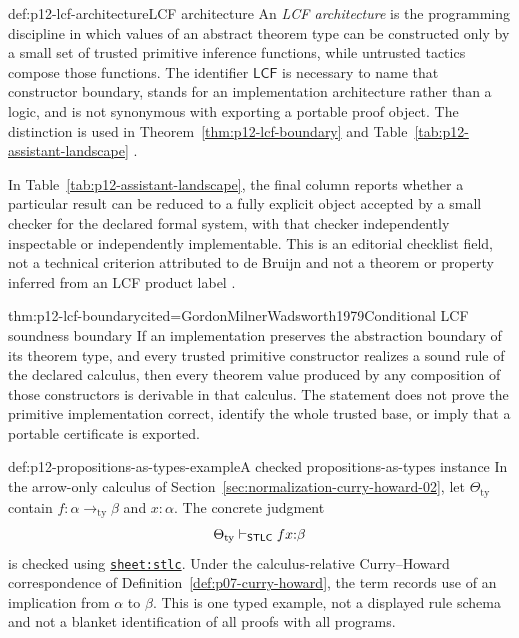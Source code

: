 \begin{hbdefinition}{def:p12-lcf-architecture}{LCF architecture}
An \emph{LCF architecture} is the programming discipline in which values of an
abstract theorem type can be constructed only by a small set of trusted
primitive inference functions, while untrusted tactics compose those
functions.  The identifier \(\mathsf{LCF}\) is necessary to name that
constructor boundary, stands for an implementation architecture rather than a
logic, and is not synonymous with exporting a portable proof object.  The
distinction is used in Theorem~\ref{thm:p12-lcf-boundary} and
Table~\ref{tab:p12-assistant-landscape}
\cite{GordonMilnerWadsworth1979}.
\end{hbdefinition}

In Table~\ref{tab:p12-assistant-landscape}, the final column reports whether a
particular result can be reduced to a fully explicit object accepted by a
small checker for the declared formal system, with that checker independently
inspectable or independently implementable.  This is an editorial checklist
field, not a technical criterion attributed to de Bruijn and not a theorem or
property inferred from an LCF product label \cite{DeBruijn1970,Pollack1998}.

\begin{hbtheorem}{thm:p12-lcf-boundary}{cited=GordonMilnerWadsworth1979}{Conditional LCF soundness boundary}
If an implementation preserves the abstraction boundary of its theorem type,
and every trusted primitive constructor realizes a sound rule of the declared
calculus, then every theorem value produced by any composition of those
constructors is derivable in that calculus.  The statement does not prove the
primitive implementation correct, identify the whole trusted base, or imply
that a portable certificate is exported.
\end{hbtheorem}

\begin{hbexample}{def:p12-propositions-as-types-example}{A checked propositions-as-types instance}
In the arrow-only calculus of Section~\ref{sec:normalization-curry-howard-02}, let
\(\Theta_{\mathrm{ty}}\) contain \(f{:}\alpha\to_{\mathrm{ty}}\beta\) and
\(x{:}\alpha\).  The concrete judgment
\[
 \Theta_{\mathrm{ty}}\vdash_{\mathsf{STLC}}fx{:}\beta
\]
is checked using \hyperref[sheet:stlc]{\texttt{sheet:stlc}}.  Under the
calculus-relative Curry--Howard correspondence of
Definition~\ref{def:p07-curry-howard}, the term records use of an implication
from \(\alpha\) to \(\beta\).  This is one typed example, not a displayed rule
schema and not a blanket identification of all proofs with all programs.
\end{hbexample}

